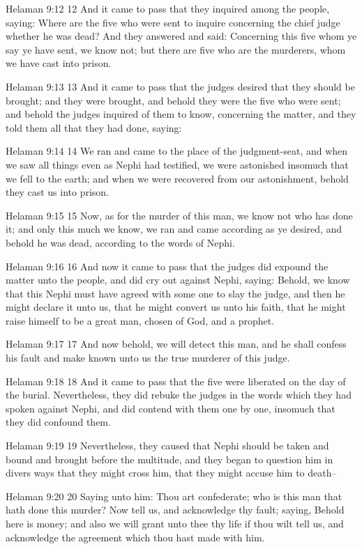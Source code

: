 Helaman 9:12
 12 And it came to pass that they inquired among the people,
saying: Where are the five who were sent to inquire concerning
the chief judge whether he was dead? And they answered and said:
Concerning this five whom ye say ye have sent, we know not; but
there are five who are the murderers, whom we have cast into
prison.

Helaman 9:13
 13 And it came to pass that the judges desired that they should
be brought; and they were brought, and behold they were the five
who were sent; and behold the judges inquired of them to know,
concerning the matter, and they told them all that they had done,
saying:

Helaman 9:14
 14 We ran and came to the place of the judgment-seat, and when
we saw all things even as Nephi had testified, we were astonished
insomuch that we fell to the earth; and when we were recovered
from our astonishment, behold they cast us into prison.

Helaman 9:15
 15 Now, as for the murder of this man, we know not who has done
it; and only this much we know, we ran and came according as ye
desired, and behold he was dead, according to the words of Nephi.

Helaman 9:16
 16 And now it came to pass that the judges did expound the
matter unto the people, and did cry out against Nephi, saying:
Behold, we know that this Nephi must have agreed with some one to
slay the judge, and then he might declare it unto us, that he
might convert us unto his faith, that he might raise himself to
be a great man, chosen of God, and a prophet.

Helaman 9:17
 17 And now behold, we will detect this man, and he shall confess
his fault and make known unto us the true murderer of this judge.

Helaman 9:18
 18 And it came to pass that the five were liberated on the day
of the burial. Nevertheless, they did rebuke the judges in the
words which they had spoken against Nephi, and did contend with
them one by one, insomuch that they did confound them.

Helaman 9:19
 19 Nevertheless, they caused that Nephi should be taken and
bound and brought before the multitude, and they began to
question him in divers ways that they might cross him, that they
might accuse him to death--

Helaman 9:20
 20 Saying unto him: Thou art confederate; who is this man that
hath done this murder? Now tell us, and acknowledge thy fault;
saying, Behold here is money; and also we will grant unto thee
thy life if thou wilt tell us, and acknowledge the agreement
which thou hast made with him.

